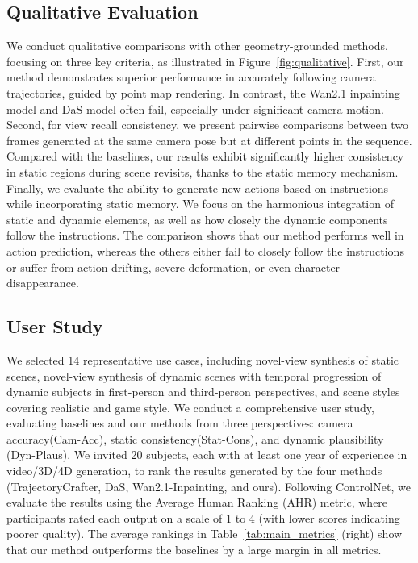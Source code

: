 \subsection{Qualitative Evaluation}
We conduct qualitative comparisons with other geometry-grounded methods, focusing on three key criteria, as illustrated in Figure~\ref{fig:qualitative}.
First, our method demonstrates superior performance in accurately following camera trajectories, guided by point map rendering. In contrast, the Wan2.1 inpainting model and DaS model often fail, especially under significant camera motion.
Second, for view recall consistency, we present pairwise comparisons between two frames generated at the same camera pose but at different points in the sequence. Compared with the baselines, our results exhibit significantly higher consistency in static regions during scene revisits, thanks to the static memory mechanism.
Finally, we evaluate the ability to generate new actions based on instructions while incorporating static memory. We focus on the harmonious integration of static and dynamic elements, as well as how closely the dynamic components follow the instructions. The comparison shows that our method performs well in action prediction, whereas the others either fail to closely follow the instructions or suffer from action drifting, severe deformation, or even character disappearance.

\subsection{User Study}
We selected 14 representative use cases, including novel-view synthesis of static scenes, novel-view synthesis of dynamic scenes with temporal progression of dynamic subjects in first-person and third-person perspectives, and scene styles covering realistic and game style. We conduct a comprehensive user study,  evaluating baselines and our methods from three perspectives: camera accuracy(Cam-Acc), static consistency(Stat-Cons), and dynamic plausibility (Dyn-Plaus). We invited 20 subjects, each with at least one year of experience in video/3D/4D generation, to rank the results generated by the four methods (TrajectoryCrafter, DaS, Wan2.1-Inpainting, and ours). Following ControlNet, we evaluate the results using the Average Human Ranking (AHR) metric, where participants rated each output on a scale of 1 to 4 (with lower scores indicating poorer quality). The average rankings in Table~\ref{tab:main_metrics} (right) show that our method outperforms the baselines by a large margin in all metrics.




